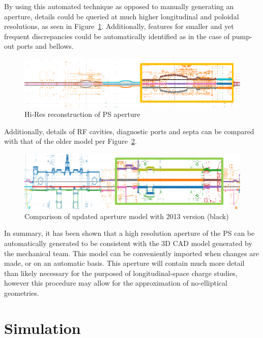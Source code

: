 By using this automated technique as opposed to manually generating an aperture, details could be queried at much higher longitudinal and poloidal resolutions, as seen in Figure~\ref{fig:ps_aperture_hi_res}. Additionally, features for smaller and yet frequent discrepancies could be automatically identified as in the case of pump-out ports and bellows.

\begin{figure}
    \centering
    \includegraphics{figs/apertture_hi_res.PNG}
    \caption{Hi-Res reconstruction of PS aperture}
    \label{fig:ps_aperture_hi_res}
\end{figure}

Additionally, details of RF cavities, diagnostic ports and septa can be compared with that of the older model per Figure~\ref{fig:ps_septa}.

\begin{figure}
    \centering
    \includegraphics{figs/aperture_comparison.PNG}
    \caption{Comparison of updated aperture model with 2013 version (black)}
    \label{fig:ps_septa}
\end{figure}

In summary, it has been shown that a high resolution aperture of the PS can be automatically generated to be consistent with the 3D CAD model generated by the mechanical team. This model can be conveniently imported when changes are made, or on an automatic basis. This aperture will contain much more detail than likely necessary for the purposed of longitudinal-space charge studies, however this procedure may allow for the approximation of no-elliptical geometries.

\chapter{Simulation}


